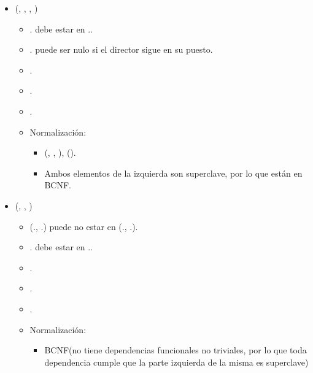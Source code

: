 \begin{itemize}
    \item {}(, , ,
          )
          \begin{itemize}
              \item {}. debe estar en
                    ..
              \item {}. puede ser nulo si el director
                    sigue en su puesto.
              \item {}.
              \item {}.
              \item {}.
              \item Normalización:
                    \begin{itemize}
                        \item {}
                              {(, , ),
                                  ()}.
                        \item Ambos elementos de la izquierda son superclave, por lo que están en BCNF.
                    \end{itemize}
          \end{itemize}

    \item {}(, , )
          \begin{itemize}
              \item (.,
                    .) puede no estar en
                    (.,
                    .).
              \item {}. debe estar en
                    ..
              \item {}.
              \item {}.
              \item {}.
              \item Normalización:
                    \begin{itemize}
                        \item BCNF(no tiene dependencias funcionales no triviales, por lo que toda
                              dependencia cumple que la parte izquierda de la misma es superclave)
                    \end{itemize}
          \end{itemize}


\end{itemize}
